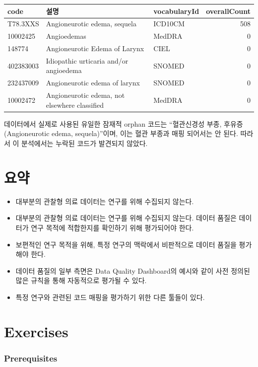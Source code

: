 \documentclass[11pt]{book}
\theoremstyle{definition}
\theoremstyle{definition}
\theoremstyle{definition}
\theoremstyle{remark}
\let\BeginKnitrBlock\begin \let\EndKnitrBlock\end
\begin{document}
\begin{longtable}[]{@{}lllr@{}}
\toprule
code & 설명 & vocabularyId & overallCount\tabularnewline
\midrule
\endhead
T78.3XXS & Angioneurotic edema, sequela & ICD10CM & 508\tabularnewline
10002425 & Angioedemas & MedDRA & 0\tabularnewline
148774 & Angioneurotic Edema of Larynx & CIEL & 0\tabularnewline
402383003 & Idiopathic urticaria and/or angioedema & SNOMED &
0\tabularnewline
232437009 & Angioneurotic edema of larynx & SNOMED & 0\tabularnewline
10002472 & Angioneurotic edema, not elsewhere classified & MedDRA &
0\tabularnewline
\bottomrule
\end{longtable}

데이터에서 실제로 사용된 유일한 잠재적 orphan 코드는 ``혈관신경성 부종,
후유증 (Angioneurotic edema, sequela)''이며, 이는 혈관 부종과 매핑
되어서는 안 된다. 따라서 이 분석에서는 누락된 코드가 발견되지 않았다.

\section{요약}\label{-13}

\BeginKnitrBlock{rmdsummary}
\begin{itemize}
\item
  대부분의 관찰형 의료 데이터는 연구를 위해 수집되지 않는다.
\item
  대부분의 관찰형 의료 데이터는 연구를 위해 수집되지 않는다. 데이터
  품질은 데이터가 연구 목적에 적합한지를 확인하기 위해 평가되어야 한다.
\item
  보편적인 연구 목적을 위해, 특정 연구의 맥락에서 비판적으로 데이터
  품질을 평가해야 한다.
\item
  데이터 품질의 일부 측면은 Data Quality Dashboard의 예시와 같이 사전
  정의된 많은 규칙을 통해 자동적으로 평가될 수 있다.
\item
  특정 연구와 관련된 코드 매핑을 평가하기 위한 다른 툴들이 있다.
\end{itemize}
\EndKnitrBlock{rmdsummary}

\section{Exercises}\label{exercises-3}

\subsubsection*{Prerequisites}\label{prerequisites-3}
\end{document}
